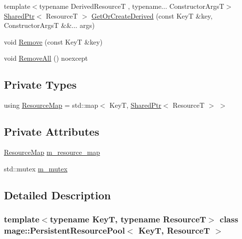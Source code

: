 \begin{DoxyCompactItemize}
\item 
{\footnotesize template$<$typename Derived\+ResourceT , typename... Constructor\+ArgsT$>$ }\\\hyperlink{namespacemage_a1e01ae66713838a7a67d30e44c67703e}{Shared\+Ptr}$<$ ResourceT $>$ \hyperlink{classmage_1_1_persistent_resource_pool_ac9331d02b4cd63459e6d96e427f4b627}{Get\+Or\+Create\+Derived} (const KeyT \&key, Constructor\+ArgsT \&\&... args)
\item 
void \hyperlink{classmage_1_1_persistent_resource_pool_ae340b1445a0c362155926ab1d0e752b0}{Remove} (const KeyT \&key)
\item 
void \hyperlink{classmage_1_1_persistent_resource_pool_acc77e3a19140fd6c758f6d4f6a961466}{Remove\+All} () noexcept
\end{DoxyCompactItemize}
\subsection*{Private Types}
\begin{DoxyCompactItemize}
\item 
using \hyperlink{classmage_1_1_persistent_resource_pool_a9215c5816fc45ab5f772625df2a8a60c}{Resource\+Map} = std\+::map$<$ KeyT, \hyperlink{namespacemage_a1e01ae66713838a7a67d30e44c67703e}{Shared\+Ptr}$<$ ResourceT $>$ $>$
\end{DoxyCompactItemize}
\subsection*{Private Attributes}
\begin{DoxyCompactItemize}
\item 
\hyperlink{classmage_1_1_persistent_resource_pool_a9215c5816fc45ab5f772625df2a8a60c}{Resource\+Map} \hyperlink{classmage_1_1_persistent_resource_pool_a9fec1e7492b5aea2a006b4e150289795}{m\+\_\+resource\+\_\+map}
\item 
std\+::mutex \hyperlink{classmage_1_1_persistent_resource_pool_ac62c20842345306be0cddda2cb0d0524}{m\+\_\+mutex}
\end{DoxyCompactItemize}


\subsection{Detailed Description}
\subsubsection*{template$<$typename KeyT, typename ResourceT$>$\newline
class mage\+::\+Persistent\+Resource\+Pool$<$ Key\+T, Resource\+T $>$}

